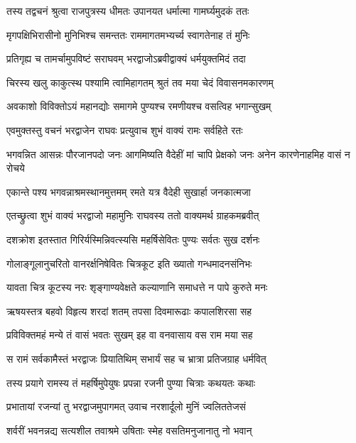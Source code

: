 \twolineshloka
{तस्य तद्वचनं श्रुत्वा राजपुत्रस्य धीमतः}
{उपानयत धर्मात्मा गामर्घ्यमुदकं ततः} %

\twolineshloka
{मृगपक्षिभिरासीनो मुनिभिश्च समन्ततः}
{राममागतमभ्यर्च्य स्वागतेनाह तं मुनिः} %

\twolineshloka
{प्रतिगृह्य च तामर्चामुपविष्टं सराघवम्}
{भरद्वाजोऽब्रवीद्वाक्यं धर्मयुक्तमिदं तदा} %

\twolineshloka
{चिरस्य खलु काकुत्स्थ पश्यामि त्वामिहागतम्}
{श्रुतं तव मया चेदं विवासनमकारणम्} %

\twolineshloka
{अवकाशो विविक्तोऽयं महानद्योः समागमे}
{पुण्यश्च रमणीयश्च वसत्विह भगान्सुखम्} %

\twolineshloka
{एवमुक्तस्तु वचनं भरद्वाजेन राघवः}
{प्रत्युवाच शुभं वाक्यं रामः सर्वहिते रतः} %

\threelineshloka
{भगवन्नित आसन्नः पौरजानपदो जनः}
{आगमिष्यति वैदेहीं मां चापि प्रेक्षको जनः}
{अनेन कारणेनाहमिह वासं न रोचये} %

\twolineshloka
{एकान्ते पश्य भगवन्नाश्रमस्थानमुत्तमम्}
{रमते यत्र वैदेही सुखार्हा जनकात्मजा} %

\twolineshloka
{एतच्छ्रुत्वा शुभं वाक्यं भरद्वाजो महामुनिः}
{राघवस्य ततो वाक्यमर्थ ग्राहकमब्रवीत्} %

\twolineshloka
{दशक्रोश इतस्तात गिरिर्यस्मिन्निवत्स्यसि}
{महर्षिसेवितः पुण्यः सर्वतः सुख दर्शनः} %

\twolineshloka
{गोलाङ्गूलानुचरितो वानरर्क्षनिषेवितः}
{चित्रकूट इति ख्यातो गन्धमादनसंनिभः} %

\twolineshloka
{यावता चित्र कूटस्य नरः शृङ्गाण्यवेक्षते}
{कल्याणानि समाधत्ते न पापे कुरुते मनः} %

\twolineshloka
{ऋषयस्तत्र बहवो विहृत्य शरदां शतम्}
{तपसा दिवमारूढाः कपालशिरसा सह} %

\twolineshloka
{प्रविविक्तमहं मन्ये तं वासं भवतः सुखम्}
{इह वा वनवासाय वस राम मया सह} %

\twolineshloka
{स रामं सर्वकामैस्तं भरद्वाजः प्रियातिथिम्}
{सभार्यं सह च भ्रात्रा प्रतिजग्राह धर्मवित्} %

\twolineshloka
{तस्य प्रयागे रामस्य तं महर्षिमुपेयुषः}
{प्रपन्ना रजनी पुण्या चित्राः कथयतः कथाः} %

\twolineshloka
{प्रभातायां रजन्यां तु भरद्वाजमुपागमत्}
{उवाच नरशार्दूलो मुनिं ज्वलिततेजसं} %

\twolineshloka
{शर्वरीं भवनन्नद्य सत्यशील तवाश्रमे}
{उषिताः स्मेह वसतिमनुजानातु नो भवान्} %

